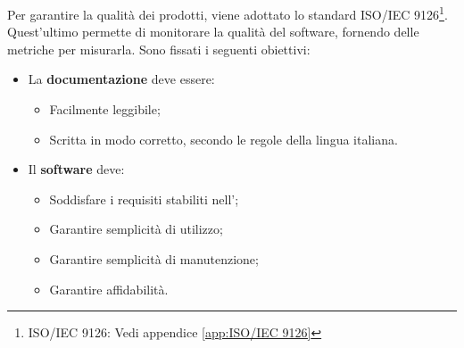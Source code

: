 Per garantire la qualità dei prodotti, viene adottato lo standard ISO/IEC 9126\footnote{ISO/IEC 9126: Vedi appendice \cref{app:ISO/IEC 9126}}. Quest'ultimo permette di monitorare la qualità del software, fornendo delle metriche per misurarla.\newline
Sono fissati i seguenti obiettivi:
\begin{itemize}
	\item La \textbf{documentazione} deve essere:
		\begin{itemize}
			\item Facilmente leggibile;
			\item Scritta in modo corretto, secondo le regole della lingua italiana.
		\end{itemize}
	\item Il \textbf{software} deve:
		\begin{itemize}
			\item Soddisfare i requisiti stabiliti nell'\AdR ;
			\item Garantire semplicità di utilizzo;			
			\item Garantire semplicità di manutenzione;
			\item Garantire affidabilità.
		\end{itemize}
		
\end{itemize}